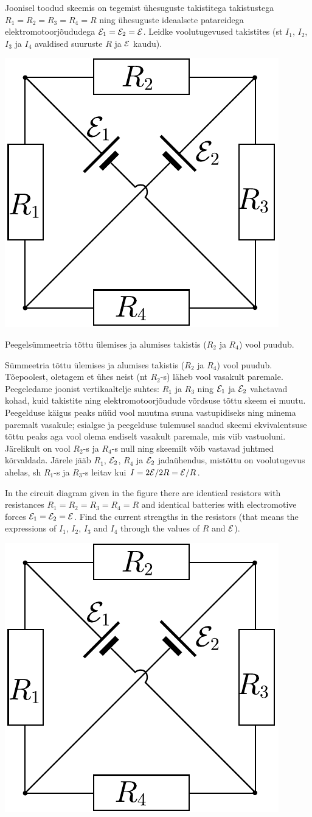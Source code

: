 
Joonisel toodud skeemis on tegemist ühesuguste takistitega takistustega $R_1 = R_2 = R_3 = R_4 = R$ ning ühesuguste
ideaalsete patareidega elektromotoorjõududega ${\cal E}_1 = {\cal E}_2
= {\cal E}$. Leidke voolutugevused takistites (st $I_1$, $I_2$, $I_3$ ja
$I_4$ avaldised suuruste $R$ ja ${\cal E}$ kaudu).

\begin{center}
\includegraphics[width=0.35\linewidth]{2012-v3g-03-elektriline_sild}%
\end{center}

\hint
Peegelsümmeetria tõttu ülemises ja alumises takistis ($R_2$ ja $R_4$) vool puudub. 

\solu
Sümmeetria tõttu ülemises ja alumises takistis ($R_2$ ja $R_4$) vool puudub. 
Tõepoolest, oletagem et ühes neist (nt $R_2$-s) läheb vool vasakult paremale. Peegeledame joonist vertikaaltelje
suhtes: $R_1$ ja $R_3$ ning ${\cal E}_1$ ja ${\cal E}_2$ vahetavad kohad, 
kuid takistite ning elektromotoorjõudude võrdsuse tõttu skeem ei muutu. Peegelduse käigus 
peaks nüüd vool muutma suuna vastupidiseks ning minema paremalt vasakule; esialgse ja 
peegelduse tulemusel saadud skeemi ekvivalentsuse tõttu peaks aga vool olema endiselt vasakult paremale,
mis viib vastuoluni. Järelikult on vool $R_2$-s ja $R_4$-s null ning skeemilt võib vastavad juhtmed kõrvaldada.
Järele jääb $R_1$, ${\cal E}_2$, $R_4$ ja ${\cal E}_2$ jadaühendus, mistõttu on voolutugevus ahelas, sh $R_1$-s ja $R_3$-s
leitav kui $I=2{\cal E}/2R = {\cal E}/R$.

In the circuit diagram given in the figure there are identical resistors with resistances $R_1 = R_2 = R_3 = R_4 = R$ and identical batteries with electromotive forces ${\cal E}_1 = {\cal E}_2
= {\cal E}$. Find the current strengths in the resistors (that means the expressions of $I_1$, $I_2$, $I_3$ and $I_4$ through the values of $R$ and ${\cal E}$).
\begin{center}
\includegraphics[width=0.35\linewidth]{2012-v3g-03-elektriline_sild}%
\end{center}

